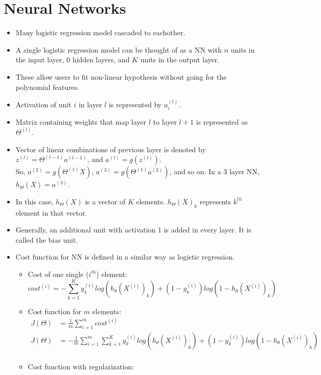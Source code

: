\documentclass{article}
\begin{document}
\section{Neural Networks}
\begin{itemize}
	\item Many logistic regression model cascaded to eachother.
	\item A single logistic regression model can be thought of as a NN with $n$ units in the input layer, 0 hidden layers, and $K$ units in the output layer.
	\item These allow users to fit non-linear hypothesis without going for the polynomial features.
	\item Activation of unit $i$ in layer $l$ is represented by $a^{(l)}_i$.
	\item Matrix containing weights that map layer $l$ to layer $l+1$ is represented as $\Theta^{(l)}$.
	\item Vector of linear combinations of previous layer is denoted by $z^{(l)} = \Theta^{(l-1)} a^{(l-1)}$, and $a^{(l)}=g(z^{(l)})$.\\
	So, $a^{(2)}=g(\Theta^{(1)} X)$, $a^{(3)}=g(\Theta^{(1)} a^{(2)})$, and so on. In a 3 layer NN, $h_\Theta(X) = a^{(3)}$.
	\item In this case, $h_\Theta(X)$ is a vector of $K$ elements. $h_\Theta(X)_k$ represents $k^{th}$ element in that vector.
	\item Generally, an additional unit with activation 1 is added in every layer. It is called the bias unit.
	\item Cost function for NN is defined in a similar way as logistic regression.
	\begin{itemize}
		\item Cost of one single ($i^{th}$) element:
		\begin{equation*}
			cost^{(i)} = -\sum_{k=1}^K y^{(i)}_klog(h_\theta(X^{(i)})_k) + (1-y^{(i)}_k)log(1-h_\theta(X^{(i)})_k)
		\end{equation*}
		\item Cost function for $m$ elements:
		\begin{align*}
			J(\Theta) &= \frac{1}{m} \sum_{i=1}^m cost^{(i)}\\
			J(\Theta) &= -\frac{1}{m} \sum_{i=1}^m \sum_{k=1}^K y^{(i)}_klog(h_\theta(X^{(i)})_k) + (1-y^{(i)}_k)log(1-h_\theta(X^{(i)})_k)\\
		\end{align*}
		\item Cost function with regularization:

\end{itemize}
\end{itemize}
\end{document}
